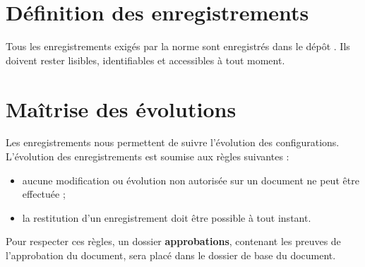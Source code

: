 
\section{Définition des enregistrements}

Tous les enregistrements exigés par la norme \isoNeufMilleUn{} sont enregistrés dans le dépôt \git. Ils doivent rester lisibles, identifiables et accessibles à tout moment.

\section{Maîtrise des évolutions}

Les enregistrements nous permettent de suivre l’évolution des configurations. L’évolution des enregistrements est soumise aux règles suivantes :
\begin{itemize}
\item aucune modification ou évolution non autorisée sur un document ne peut être effectuée ;
\item la restitution d’un enregistrement doit être possible à tout instant.
\end{itemize}

Pour respecter ces règles, un dossier \textbf{approbations}, contenant les preuves de l’approbation du document, sera placé dans le dossier de base du document.\\

